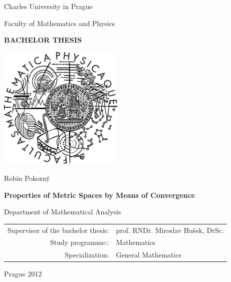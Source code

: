 \documentclass[12pt,a4paper]{report}
\begin{document}
\pagestyle{empty}
\begin{center}

\large

Charles University in Prague

\medskip

Faculty of Mathematics and Physics

\vfill

{\bf\Large BACHELOR THESIS}

\vfill


\centerline{\mbox{\includegraphics[width=60mm]{logo.eps}}}

\vfill
\vspace{5mm}

{\LARGE Robin Pokorný}

\vspace{15mm}

{\LARGE\bfseries Properties of Metric Spaces by Means of Convergence}

\vfill

Department of Mathematical Analysis

\vfill

\begin{tabular}{rl}

Supervisor of the bachelor thesis: & prof. RNDr. Miroslav Hušek, DrSc. \\
\noalign{\vspace{2mm}}
Study programme:: & Mathematics \\
\noalign{\vspace{2mm}}
Specialization: & General Mathematics \\
\end{tabular}


\vfill

Prague 2012

\end{center}
\end{document}
